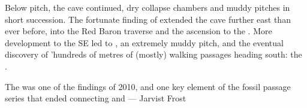 Below  pitch, the cave continued, dry collapse chambers and muddy pitches in short succession. The fortunate finding of  extended the cave further east than ever before, into the Red Baron traverse and the ascension to the . More development to the SE led to , an extremely muddy pitch, and the eventual discovery of 'hundreds of metres of (mostly) walking passages heading south: the .
\begin{marginfigure}
	\checkoddpage \ifoddpage \forcerectofloat \else \forceversofloat \fi
	\centering	{} 
  	\caption{The \protect{} was one of the findings of 2010, and one key element of the fossil passage series that ended connecting \protect{} and \protect{}--- Jarvist Frost}
	\end{marginfigure}


